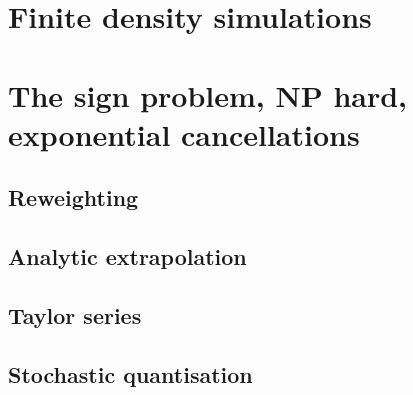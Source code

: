 \section{Finite density simulations} \label{sec-finite-density-lattice}

\section{The sign problem, NP hard, exponential cancellations}
\label{sec-sign-problem}

\subsection{Reweighting}
\subsection{Analytic extrapolation}
\subsection{Taylor series}
\subsection{Stochastic quantisation}
